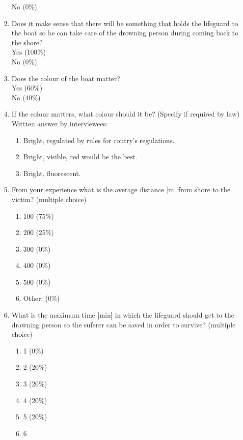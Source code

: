 \documentclass{article}[10pt]
\begin{document}
\begin{enumerate}
                No (0\%)
    \item Does it make sense that there will be something that holds the lifeguard to the boat so he can take care of the drowning person during coming back to the shore?\\
                Yes (100\%)\\
                No (0\%)
    \item Does the colour of the boat matter?\\
                Yes (60\%)\\
                No (40\%)
    \item If the colour matters, what colour should it be? (Specify if required by law)\\
            Written answer by interviewees:
            \begin{enumerate}
                \item Bright, regulated by rules for coutry's regulations.
                \item Bright, visible, red would be the best.
                \item Bright, fluorescent.
            \end{enumerate} 
            \newpage
    \item From your experience what is the average distance [m] from shore to the victim? (multiple choice) 
    \begin{enumerate}    
        \item  100 (75\%)
        \item  200 (25\%)
        \item  300 (0\%)
        \item  400 (0\%)
        \item  500 (0\%)
        \item  Other: (0\%)
        \end{enumerate}
    \item What is the maximum time [min] in which the lifeguard should get to the drawning person so the suferer can be saved in order to survive? (multiple choice)
    \begin{enumerate}        
        \item   1 (0\%)
        \item   2 (20\%)
        \item   3 (20\%)
        \item   4 (20\%)
        \item   5 (20\%)
        \item   6

\end{enumerate}
\end{enumerate}
\end{document}
